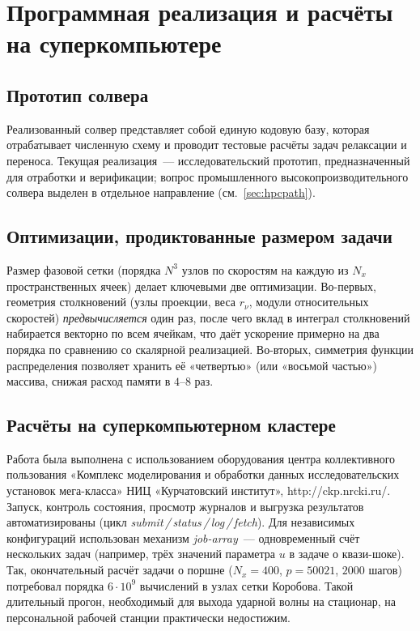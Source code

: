 \chapter{Программная реализация и расчёты на суперкомпьютере}

\section{Прототип солвера}

Реализованный солвер представляет собой единую кодовую базу, которая отрабатывает численную схему и проводит тестовые
расчёты задач релаксации и переноса.
Текущая реализация~--- исследовательский прототип, предназначенный для отработки и верификации; вопрос промышленного
высокопроизводительного солвера выделен в отдельное направление (см.~\ref{sec:hpcpath}).

\section{Оптимизации, продиктованные размером задачи}

Размер фазовой сетки (порядка $N^3$ узлов по скоростям на каждую из $N_x$ пространственных ячеек) делает ключевыми две
оптимизации.
Во-первых, геометрия столкновений (узлы проекции, веса $r_\nu$, модули относительных скоростей) \emph{предвычисляется}
один раз, после чего вклад в интеграл столкновений набирается векторно по всем ячейкам, что даёт ускорение примерно на
два порядка по сравнению со скалярной реализацией.
Во-вторых, симметрия функции распределения позволяет хранить её «четвертью» (или «восьмой частью») массива, снижая
расход памяти в $4$--$8$ раз.

\section{Расчёты на суперкомпьютерном кластере}

Работа была выполнена с использованием оборудования центра коллективного пользования «Комплекс моделирования и обработки
данных исследовательских установок мега-класса» НИЦ «Курчатовский институт», http://ckp.nrcki.ru/.
Запуск, контроль состояния, просмотр журналов и выгрузка результатов автоматизированы (цикл
\emph{submit\,/\,status\,/\,log\,/\,fetch}).
Для независимых конфигураций использован механизм \emph{job-array}~--- одновременный счёт нескольких задач (например,
трёх значений параметра $u$ в задаче о квази-шоке).
Так, окончательный расчёт задачи о поршне ($N_x=400$, $p=50021$, $2000$ шагов) потребовал порядка $6 \cdot 10^{9}$
вычислений в узлах сетки Коробова.
Такой длительный прогон, необходимый для выхода ударной волны на стационар, на персональной рабочей станции практически
недостижим.

